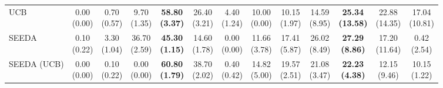 \begin{table}[H]
{\begin{tabular}{l|cccccc|cccccc}
UCB & \makecell{0.00 \\ (0.00)} & \makecell{0.70 \\ (0.57)} & {\cellcolor[HTML]{C8E6C9}} \makecell{9.70 \\ (1.35)} & \bfseries \makecell{58.80 \\ (3.37)} & \makecell{26.40 \\ (3.21)} & \makecell{4.40 \\ (1.24)} & \makecell{10.00 \\ (0.00)} & \makecell{10.15 \\ (1.97)} & {\cellcolor[HTML]{C8E6C9}} \makecell{14.59 \\ (8.95)} & \bfseries \makecell{25.34 \\ (13.58)} & \makecell{22.88 \\ (14.35)} & \makecell{17.04 \\ (10.81)} \\
SEEDA & \makecell{0.10 \\ (0.22)} & \makecell{3.30 \\ (1.04)} & {\cellcolor[HTML]{C8E6C9}} \makecell{36.70 \\ (2.59)} & \bfseries \makecell{45.30 \\ (1.15)} & \makecell{14.60 \\ (1.78)} & \makecell{0.00 \\ (0.00)} & \makecell{11.66 \\ (3.78)} & \makecell{17.41 \\ (5.87)} & {\cellcolor[HTML]{C8E6C9}} \makecell{26.02 \\ (8.49)} & \bfseries \makecell{27.29 \\ (8.86)} & \makecell{17.20 \\ (11.64)} & \makecell{0.42 \\ (2.54)} \\
SEEDA (UCB) & \makecell{0.00 \\ (0.00)} & \makecell{0.10 \\ (0.22)} & {\cellcolor[HTML]{C8E6C9}} \makecell{0.00 \\ (0.00)} & \bfseries \makecell{60.80 \\ (1.79)} & \makecell{38.70 \\ (2.02)} & \makecell{0.40 \\ (0.42)} & \makecell{14.82 \\ (5.00)} & \makecell{19.57 \\ (2.51)} & {\cellcolor[HTML]{C8E6C9}} \makecell{21.08 \\ (3.47)} & \bfseries \makecell{22.23 \\ (4.38)} & \makecell{12.15 \\ (9.46)} & \makecell{10.15 \\ (1.22)} \\

\end{tabular}}
\end{table}
